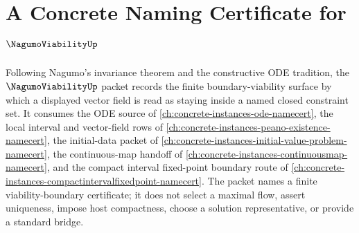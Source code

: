 \chapter{A Concrete Naming Certificate for $\NagumoViabilityUp$}
\label{ch:concrete-instances-nagumo-viability-namecert}

Following Nagumo's invariance theorem and the constructive ODE tradition, the $\NagumoViabilityUp$ packet records the finite boundary-viability surface by which a displayed vector field is read as staying inside a named closed constraint set. It consumes the ODE source of \autoref{ch:concrete-instances-ode-namecert}, the local interval and vector-field rows of \autoref{ch:concrete-instances-peano-existence-namecert}, the initial-data packet of \autoref{ch:concrete-instances-initial-value-problem-namecert}, the continuous-map handoff of \autoref{ch:concrete-instances-continuousmap-namecert}, and the compact interval fixed-point boundary route of \autoref{ch:concrete-instances-compactintervalfixedpoint-namecert}. The packet names a finite viability-boundary certificate; it does not select a maximal flow, assert uniqueness, impose host compactness, choose a solution representative, or provide a standard bridge.

